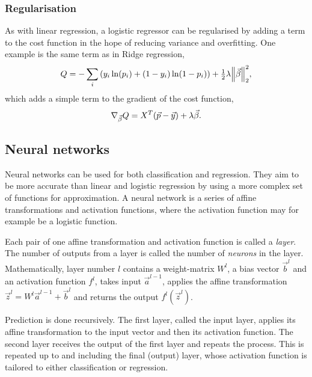 \documentclass[11pt,british,a4paper]{article}
\numberwithin{equation}{section}
\begin{document}
\subsubsection{Regularisation}
As with linear regression, a logistic regressor can be regularised by adding a term to the cost function in the hope of reducing variance and overfitting.
One example is the same term as in Ridge regression,
\begin{equation}
    Q = - \sum_i \qty(y_i \ln(p_i) + (1-y_i)\ln(1-p_i)) + \tfrac{1}{2}\lambda \norm{\vec{\beta}}_2^2,
\end{equation}
which adds a simple term to the gradient of the cost function,
\begin{equation}
    \nabla_{\vec{\beta}} Q = X^T \qty(\vec{p} - \vec{y}) + \lambda \vec{\beta}.
\end{equation}


\subsection{Neural networks}
Neural networks can be used for both classification and regression.
They aim to be more accurate than linear and logistic regression by using a more complex set of functions for approximation.
A neural network is a series of affine transformations and activation functions, where the activation function may for example be a logistic function.

Each pair of one affine transformation and activation function is called a \emph{layer}. The number of outputs from a layer is called the number of \emph{neurons} in the layer. Mathematically, layer number \(l\) contains a weight-matrix \(W^l\), a bias vector \(\vec{b}^l\) and an activation function \(f^l\), takes input \(\vec{a}^{l-1}\), applies the affine transformation \(\vec{z}^l = W^l \vec{a}^{l-1} + \vec{b}^l\) and returns the output \(f^l(\vec{z}^l)\).

Prediction is done recursively. The first layer, called the input layer, applies its affine transformation to the input vector and then its activation function. The second layer receives the output of the first layer and repeats the process. This is repeated up to and including the final (output) layer, whose activation function is tailored to either classification or regression.
\end{document}
